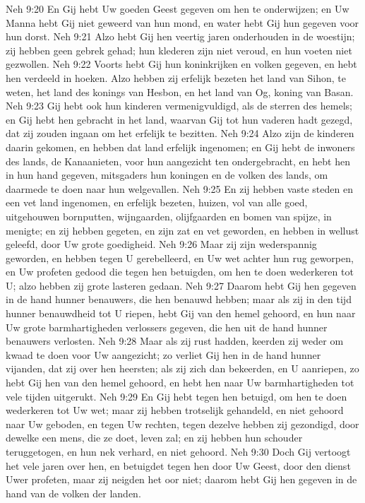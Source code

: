 Neh 9:20  En Gij hebt Uw goeden Geest gegeven om hen te onderwijzen; en Uw Manna hebt Gij niet geweerd van hun mond, en water hebt Gij hun gegeven voor hun dorst.
Neh 9:21  Alzo hebt Gij hen veertig jaren onderhouden in de woestijn; zij hebben geen gebrek gehad; hun klederen zijn niet veroud, en hun voeten niet gezwollen.
Neh 9:22  Voorts hebt Gij hun koninkrijken en volken gegeven, en hebt hen verdeeld in hoeken. Alzo hebben zij erfelijk bezeten het land van Sihon, te weten, het land des konings van Hesbon, en het land van Og, koning van Basan.
Neh 9:23  Gij hebt ook hun kinderen vermenigvuldigd, als de sterren des hemels; en Gij hebt hen gebracht in het land, waarvan Gij tot hun vaderen hadt gezegd, dat zij zouden ingaan om het erfelijk te bezitten.
Neh 9:24  Alzo zijn de kinderen daarin gekomen, en hebben dat land erfelijk ingenomen; en Gij hebt de inwoners des lands, de Kanaanieten, voor hun aangezicht ten ondergebracht, en hebt hen in hun hand gegeven, mitsgaders hun koningen en de volken des lands, om daarmede te doen naar hun welgevallen.
Neh 9:25  En zij hebben vaste steden en een vet land ingenomen, en erfelijk bezeten, huizen, vol van alle goed, uitgehouwen bornputten, wijngaarden, olijfgaarden en bomen van spijze, in menigte; en zij hebben gegeten, en zijn zat en vet geworden, en hebben in wellust geleefd, door Uw grote goedigheid.
Neh 9:26  Maar zij zijn wederspannig geworden, en hebben tegen U gerebelleerd, en Uw wet achter hun rug geworpen, en Uw profeten gedood die tegen hen betuigden, om hen te doen wederkeren tot U; alzo hebben zij grote lasteren gedaan.
Neh 9:27  Daarom hebt Gij hen gegeven in de hand hunner benauwers, die hen benauwd hebben; maar als zij in den tijd hunner benauwdheid tot U riepen, hebt Gij van den hemel gehoord, en hun naar Uw grote barmhartigheden verlossers gegeven, die hen uit de hand hunner benauwers verlosten.
Neh 9:28  Maar als zij rust hadden, keerden zij weder om kwaad te doen voor Uw aangezicht; zo verliet Gij hen in de hand hunner vijanden, dat zij over hen heersten; als zij zich dan bekeerden, en U aanriepen, zo hebt Gij hen van den hemel gehoord, en hebt hen naar Uw barmhartigheden tot vele tijden uitgerukt.
Neh 9:29  En Gij hebt tegen hen betuigd, om hen te doen wederkeren tot Uw wet; maar zij hebben trotselijk gehandeld, en niet gehoord naar Uw geboden, en tegen Uw rechten, tegen dezelve hebben zij gezondigd, door dewelke een mens, die ze doet, leven zal; en zij hebben hun schouder teruggetogen, en hun nek verhard, en niet gehoord.
Neh 9:30  Doch Gij vertoogt het vele jaren over hen, en betuigdet tegen hen door Uw Geest, door den dienst Uwer profeten, maar zij neigden het oor niet; daarom hebt Gij hen gegeven in de hand van de volken der landen.
